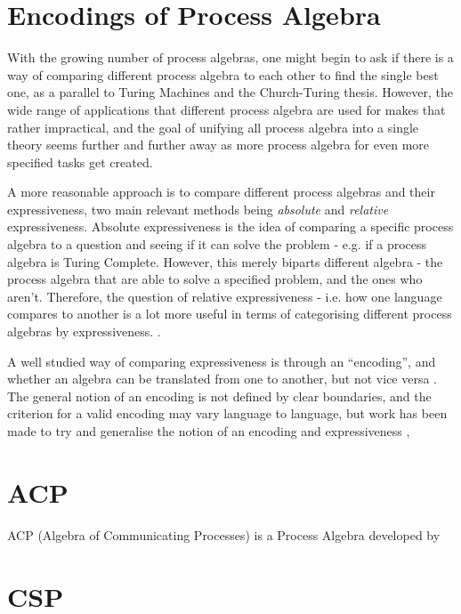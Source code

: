 \documentclass[logo,bsc,singlespacing,parskip,online]{infthesis}
\begin{document}
\section{Encodings of Process Algebra}

With the growing number of process algebras, one might begin to ask if there is a way of comparing different process algebra to each other to find the single best one, as a parallel to Turing Machines and the Church-Turing thesis. However, the wide range of applications that different process algebra are used for makes that rather impractical, and the goal of unifying all process algebra into a single theory seems further and further away as more process algebra for even more specified tasks get created.

A more reasonable approach is to compare different process algebras and their expressiveness, two main relevant methods being \textit{absolute} and \textit{relative} expressiveness.\citep{parrow_expressiveness_2008} Absolute expressiveness is the idea of comparing a specific process algebra to a question and seeing if it can solve the problem - e.g. if a process algebra is Turing Complete. However, this merely biparts different algebra - the process algebra that are able to solve a specified problem, and the ones who aren't. Therefore, the question of relative expressiveness - i.e. how one language compares to another is a lot more useful in terms of categorising different process algebras by expressiveness. .

A well studied way of comparing expressiveness is through an ``encoding'', and whether an algebra can be translated from one to another, but not vice versa \citep{gorla_towards_2010}. The general notion of an encoding is not defined by clear boundaries, and the criterion for a valid encoding may vary language to language, but work has been made to try and generalise the notion of an encoding and expressiveness \citep{gorla_towards_2010}, \citep{glabbeek_theory_2018}

\section{ACP}
ACP (Algebra of Communicating Processes) is a Process Algebra developed by
\section{CSP}



% 


\end{document}
